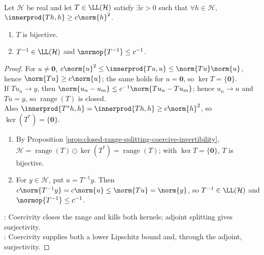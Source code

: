\begin{theorem} \label{thm:coercive-hilbert-operator-invertibility} \\
Let $\mathcal{H}$ be real and let $T\in\LL(\mathcal{H})$ satisfy $\exists c>0$ such that $\forall h\in\mathcal{H}$, $\innerprod{Th,h}\geq c\norm{h}^2$.
\begin{enumerate}[label=(\roman*)]
\setlength{\itemsep}{0pt}
\item $T$ is bijective.
\item $T^{-1}\in\LL(\mathcal{H})$ and $\normop{T^{-1}}\leq c^{-1}$.
\end{enumerate}
\begin{proof}
For $u\neq\mathbf0$, $c\norm{u}^2\leq\innerprod{Tu,u}\leq\norm{Tu}\norm{u}$, hence $\norm{Tu}\geq c\norm{u}$; the same holds for $u=\mathbf0$, so $\ker T=\{\mathbf0\}$.\\
If $Tu_n\to y$, then $\norm{u_n-u_m}\leq c^{-1}\norm{Tu_n-Tu_m}$; hence $u_n\to u$ and $Tu=y$, so $\operatorname{range}(T)$ is closed.\\
Also $\innerprod{T^*h,h}=\innerprod{Th,h}\geq c\norm{h}^2$, so $\ker(T^*)=\{\mathbf0\}$.
\begin{enumerate}[label=(\roman*)]
\setlength{\itemsep}{0pt}
\item By Proposition \ref{prop:closed-range-splitting-coercive-invertibility}, $\mathcal H=\operatorname{range}(T)\odot\ker(T^*)=\operatorname{range}(T)$; with $\ker T=\{\mathbf0\}$, $T$ is bijective.
\item For $y\in\mathcal H$, put $u=T^{-1}y$. Then $c\norm{T^{-1}y}=c\norm{u}\leq\norm{Tu}=\norm{y}$, so $T^{-1}\in\LL(\mathcal H)$ and $\normop{T^{-1}}\leq c^{-1}$.
\end{enumerate}
: Coercivity closes the range and kills both kernels; adjoint splitting gives surjectivity.\\
: Coercivity supplies both a lower Lipschitz bound and, through the adjoint, surjectivity.
\end{proof}
\end{theorem}

